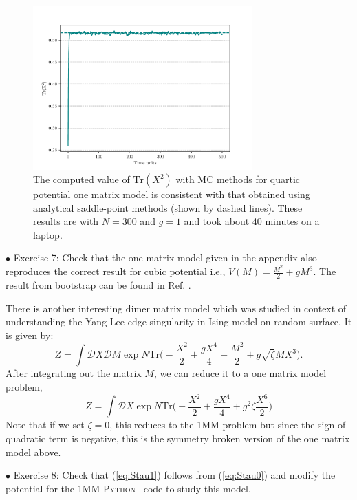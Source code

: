 \documentclass[11pt]{article}
\newcommand{\PY}{\textsc{Python}}
\begin{document}
\begin{figure}[htbp] 
	\centering 
	\includegraphics[width=0.75\textwidth]{figs/mm_plot.pdf}
	\caption{\label{fig:1MM_res}The computed value of $\mbox{Tr}(X^2)$ with MC methods for quartic potential
		one matrix model is consistent with that obtained using analytical saddle-point methods (shown by dashed lines). 
		These results are with $N = 300$ and $g = 1$ and took about 40 minutes on a laptop.}
\end{figure}


\begin{mdframed}[backgroundcolor=blue!3] 
	\textsc{} 
	$\bullet$ Exercise 7:  Check that the one matrix model given in the appendix also reproduces the correct result for cubic potential 
	i.e., $V(M) = \frac{M^2}{2} + gM^3$. The result from bootstrap can be found in Ref. \cite{Kazakov:2021lel}. \\ 
	\label{ex:7} 
\end{mdframed} 

There is another interesting dimer matrix model which was 
studied in context of understanding the Yang-Lee edge singularity \cite{Staudacher:1989fy} in Ising model on random surface. It is given by: 
\begin{equation}
	\label{eq:Stau0}
	Z = \int \mathcal{D}X \mathcal{D}M \exp N \mbox{Tr}\Bigg(-\frac{X^2}{2} + \frac{gX^4}{4} - \frac{M^2}{2} + g \sqrt{\zeta} MX^3 \Bigg).
\end{equation}
After integrating out the matrix $M$, we can reduce it to a one matrix model problem, 
\begin{equation}
	\label{eq:Stau1} 
	Z = \int \mathcal{D}X \exp N \mbox{Tr}\Bigg(-\frac{X^2}{2} + \frac{gX^4}{4} + g^2 \zeta  \frac{X^6}{2}   \Bigg)
\end{equation}
Note that if we set $\zeta=0$, this reduces to the 1MM problem but since the sign of quadratic term is negative, this is the symmetry broken version of the one matrix model above. 
\begin{mdframed}[backgroundcolor=blue!3]  
	$\bullet$ Exercise 8: Check that (\ref{eq:Stau1}) follows from (\ref{eq:Stau0}) and modify the potential for the 1MM \PY~ code to study this model. 
\end{mdframed} 
\end{document}
